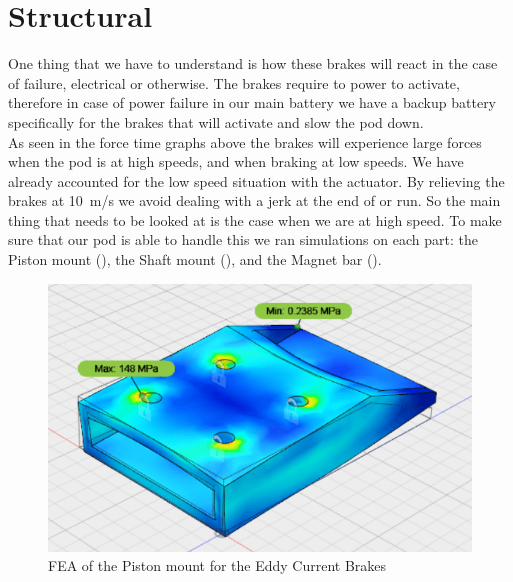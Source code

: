 \documentclass[main.tex]{subfiles}
\begin{document}
    \section{Structural}
    One thing that we have to understand is how these brakes will react in the case of failure, electrical or otherwise. The brakes require to power to activate, therefore in case of power failure in our main battery we have a backup battery specifically for the brakes that will activate and slow the pod down.  \\
    As seen in the force time graphs above  the brakes will experience large forces when the pod is at high speeds, and when braking at low speeds. We have already accounted for the low speed situation with the actuator. By relieving the brakes at \SI{10}{m/s} we avoid dealing with a jerk at the end of or run. So the main thing that needs to be looked at is the case when we are at high speed. To make sure that our pod is able to handle this we ran simulations on each part: the Piston mount (), the Shaft mount (), and the Magnet bar ().\\
    \begin{figure}
    	\centering
        \includegraphics[width =\linewidth]{images/ECPistonMount}
        \caption{FEA of the Piston mount for the Eddy Current Brakes}
        \label{fig:ECPiston}
    \end{figure}
\end{document}
